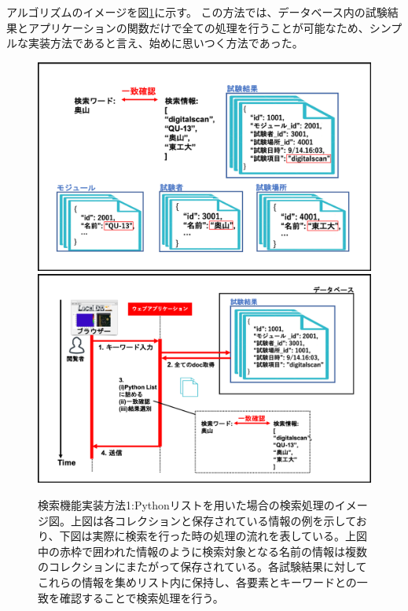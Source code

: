 アルゴリズムのイメージを図\ref{search_python_list}に示す。
この方法では、データベース内の試験結果とアプリケーションの関数だけで全ての処理を行うことが可能なため、シンプルな実装方法であると言え、始めに思いつく方法であった。

\begin{figure}[bpt]
  \begin{center}
    \includegraphics[width=12cm]{./search_python_list.png}
    \includegraphics[width=12cm]{./search_python_list_flow.png}
  \caption[検索機能実装方法1:Pythonリストを用いた場合]
{検索機能実装方法1:Pythonリストを用いた場合の検索処理のイメージ図。上図は各コレクションと保存されている情報の例を示しており、下図は実際に検索を行った時の処理の流れを表している。上図中の赤枠で囲われた情報のように検索対象となる名前の情報は複数のコレクションにまたがって保存されている。各試験結果に対してこれらの情報を集めリスト内に保持し、各要素とキーワードとの一致を確認することで検索処理を行う。}
  \label{search_python_list}
  \end{center}
\end{figure}

